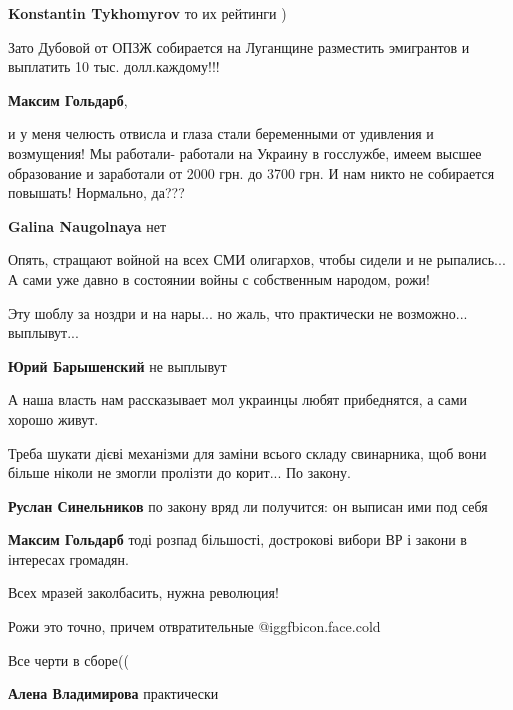 \begin{itemize}
\begin{itemize}
\textbf{Konstantin Tykhomyrov} то их рейтинги )
\end{itemize} %


Зато Дубовой от ОПЗЖ собирается на Луганщине разместить эмигрантов и выплатить
10 тыс. долл.каждому!!!

\textbf{Максим Гольдарб}, 

и у меня челюсть отвисла и глаза стали беременными от удивления и возмущения!
Мы работали- работали на Украину в госслужбе, имеем высшее образование и
заработали от 2000 грн. до 3700 грн. И нам никто не собирается повышать!
Нормально, да???

\textbf{Galina Naugolnaya} нет


Опять, стращают войной на всех СМИ олигархов, чтобы сидели и не рыпались... А
сами уже давно в состоянии войны с собственным народом, рожи!


Эту шоблу за ноздри и на нары... но жаль, что практически не возможно...
выплывут...

\textbf{Юрий Барышенский} не выплывут


А наша власть нам рассказывает мол украинцы любят прибеднятся, а сами хорошо
живут.


Треба шукати дієві механізми для заміни всього складу свинарника, щоб вони
більше ніколи не змогли пролізти до корит... По закону.

\begin{itemize} %
\textbf{Руслан Синельников} по закону вряд ли получится: он выписан ими под себя

\textbf{Максим Гольдарб} тоді розпад більшості, дострокові вибори ВР і закони в інтересах громадян.
\end{itemize} %

Всех мразей заколбасить, нужна революция!

Рожи это точно, причем отвратительные @igg{fbicon.face.cold} 

Все черти в сборе((

\textbf{Алена Владимирова} практически


\end{itemize}
